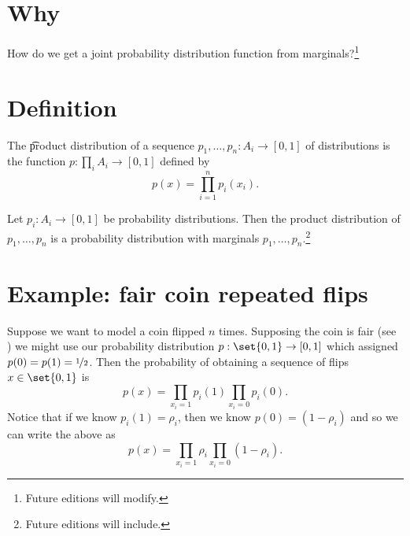 
\section*{Why}

How do we get a joint probability distribution function from marginals?\footnote{Future editions will modify.}

\section*{Definition}

The \t{product distribution} of a sequence $p_1, \dots , p_n: A_i \to [0, 1]$ of distributions is the function $p: \prod_{i} A_i \to [0, 1]$ defined by
\[
p(x) = \prod_{i = 1}^{n} p_i(x_i).
\]

\begin{proposition}
Let $p_i: A_i \to [0, 1]$ be probability distributions.
Then the product distribution of $p_1, \dots , p_n$ is a probability distribution with marginals $p_1, \dots , p_n$.\footnote{Future editions will include.}
\end{proposition}

\section*{Example: fair coin repeated flips}

Suppose we want to model a coin flipped $n$ times.
Supposing the coin is fair (see ) we might use our probability distribution $p: \set{0, 1} \to [0, 1]$ which assigned $p(0) = p(1) = \nicefrac{1}{2}$.
Then the probability of obtaining a sequence of flips $x \in \set{0, 1}$ is
\[
\textstyle
p(x) = \prod_{x_i = 1} p_i(1) \prod_{x_i = 0} p_i(0).
\]
Notice that if we know $p_i(1) = \rho _i$, then we know $p(0) = (1-\rho _i)$ and so we can write the above as
\[
\textstyle
p(x) = \prod_{x_i = 1} \rho _i \prod_{x_i = 0} (1-\rho _i).
\]
